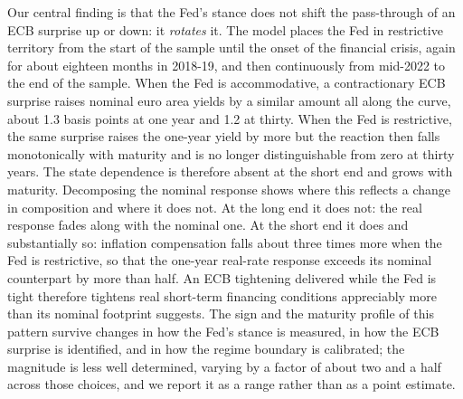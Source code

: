 Our central finding is that the Fed's stance does not shift the pass-through of an ECB surprise up or down: it \textit{rotates} it. The model places the Fed in restrictive territory from the start of the sample until the onset of the financial crisis, again for about eighteen months in 2018-19, and then continuously from mid-2022 to the end of the sample. When the Fed is accommodative, a contractionary ECB surprise raises nominal euro area yields by a similar amount all along the curve, about 1.3 basis points at one year and 1.2 at thirty. When the Fed is restrictive, the same surprise raises the one-year yield by more but the reaction then falls monotonically with maturity and is no longer distinguishable from zero at thirty years. The state dependence is therefore absent at the short end and grows with maturity.%
Decomposing the nominal response shows where this reflects a change in composition and where it does not. At the long end it does not: the real response fades along with the nominal one. At the short end it does and substantially so: inflation compensation falls about three times more when the Fed is restrictive, so that the one-year real-rate response exceeds its nominal counterpart by more than half. An ECB tightening delivered while the Fed is tight therefore tightens real short-term financing conditions appreciably more than its nominal footprint suggests. The sign and the maturity profile of this pattern survive changes in how the Fed's stance is measured, in how the ECB surprise is identified, and in how the regime boundary is calibrated; the magnitude is less well determined, varying by a factor of about two and a half across those choices, and we report it as a range rather than as a point estimate.


